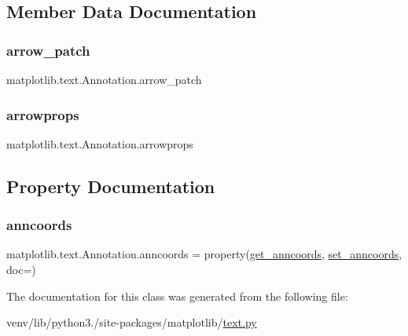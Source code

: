 \subsection{Member Data Documentation}
\mbox{\label{classmatplotlib_1_1text_1_1Annotation_a9805c725c9a148b0858499e83209da49}} 
\subsubsection{\texorpdfstring{arrow\+\_\+patch}{arrow\_patch}}
{\footnotesize\ttfamily matplotlib.\+text.\+Annotation.\+arrow\+\_\+patch}

\mbox{\label{classmatplotlib_1_1text_1_1Annotation_a4f0a93979003c07b7749599b60099f34}} 
\subsubsection{\texorpdfstring{arrowprops}{arrowprops}}
{\footnotesize\ttfamily matplotlib.\+text.\+Annotation.\+arrowprops}



\subsection{Property Documentation}
\mbox{\label{classmatplotlib_1_1text_1_1Annotation_a43ac903014a0b61e82f60e4a3c78b48e}} 
\subsubsection{\texorpdfstring{anncoords}{anncoords}}
{\footnotesize\ttfamily matplotlib.\+text.\+Annotation.\+anncoords = property(\hyperlink{classmatplotlib_1_1text_1_1Annotation_a3085c0367a0399d0295b5b30bd4323b8}{get\+\_\+anncoords}, \hyperlink{classmatplotlib_1_1text_1_1Annotation_a67a447f47cb92d617950725500222248}{set\+\_\+anncoords}, doc=)\hspace{0.3cm}{\ttfamily [static]}}



The documentation for this class was generated from the following file\+:\begin{DoxyCompactItemize}
\item 
venv/lib/python3./site-\/packages/matplotlib/\hyperlink{matplotlib_2text_8py}{text.\+py}\end{DoxyCompactItemize}
